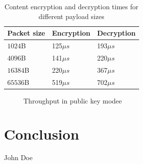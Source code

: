 \documentclass[conference,letterpaper,10pt]{IEEEtran}
\begin{document}
\begin{table}[!h]
\centering
\caption{Content encryption and decryption times for different payload sizes}
\label{my-label}
\begin{tabular}{|l|l|l|}
\hline
Packet size        & Encryption & Decryption \\ \hline
$1024$B & 125$\mu s$        & 193$\mu s$        \\ \hline
$4096$B & 141$\mu s$        & 220$\mu s$        \\ \hline
$16384$B & 220$\mu s$        & 367$\mu s$        \\ \hline
$65536$B & 519$\mu s$        & 702$\mu s$        \\ \hline
\end{tabular}
\end{table}

\begin{figure}[!t]
\centering
  \hfil
  \hfil
\caption{Throughput in public key modee}\label{fig_reenc}
\end{figure}


\section{Conclusion}\label{conclusion}


\ifCLASSOPTIONcaptionsoff
  \newpage
\fi

\tiny



\begin{IEEEbiography}{John Doe}
\blindtext
\end{IEEEbiography}
\end{document}
